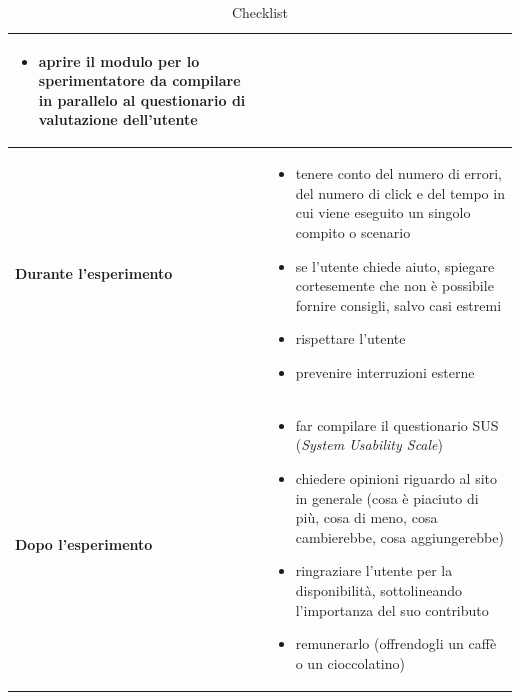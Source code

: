 \begin{table}[H]
\begin{tabularx}{\textwidth}{|>{\raggedright\bfseries\arraybackslash}p{3.5cm}|>{\raggedright\arraybackslash}X|}
\begin{itemize}[itemsep=2pt, topsep=2pt, parsep=0pt]
        \item aprire il modulo per lo sperimentatore da compilare in parallelo al questionario di valutazione dell'utente
    \end{itemize}
    \vspace{-6pt} \\
    \hline
    Durante l'esperimento &
    \vspace{-8pt}
    \begin{itemize}[itemsep=2pt, topsep=2pt, parsep=0pt]
        \item tenere conto del numero di errori, del numero di click e del tempo in cui viene eseguito un singolo compito o scenario
        \item se l'utente chiede aiuto, spiegare cortesemente che non è possibile fornire consigli, salvo casi estremi
        \item rispettare l'utente
        \item prevenire interruzioni esterne
    \end{itemize}
    \vspace{-6pt} \\
    \hline
    Dopo l'esperimento &
    \vspace{-8pt}
    \begin{itemize}[itemsep=2pt, topsep=2pt, parsep=0pt]
        \item far compilare il questionario SUS (\textit{System Usability Scale})
        \item chiedere opinioni riguardo al sito in generale (cosa è piaciuto di più, cosa di meno, cosa cambierebbe, cosa aggiungerebbe)
        \item ringraziare l'utente per la disponibilità, sottolineando l'importanza del suo contributo
        \item remunerarlo (offrendogli un caffè o un cioccolatino)
    \end{itemize}
    \vspace{-6pt} \\
    \hline
  \end{tabularx}
  \caption{Checklist}
  \label{checklist}
\end{table}

